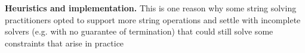 \smallskip
\noindent
\textbf{Heuristics and implementation.}
This is one reason why some string solving practitioners opted to support more string
operations and settle with incomplete solvers (e.g. with no guarantee of termination) that could
still solve some constraints that arise in practice







%
%
% 
 
